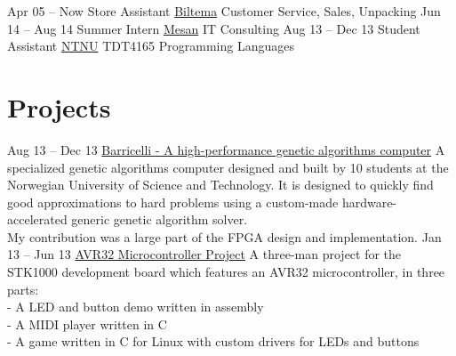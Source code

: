 \documentclass[print]{friggeri-cv}
\begin{document}
\begin{entrylist}
    \entry
        {Apr 05 – Now}
        {Store Assistant}
        {\href{http://biltema.no/}{Biltema}}
        {Customer Service, Sales, Unpacking}
    \entry
        {Jun 14 – Aug 14}
        {Summer Intern}
        {\href{http://mesan.no/}{Mesan}}
        {IT Consulting}
    \entry
        {Aug 13 – Dec 13}
        {Student Assistant}
        {\href{http://ntnu.no/}{NTNU}}
        {TDT4165 Programming Languages}
\end{entrylist}

\section{Projects}

\begin{entrylist}
    \entry
        {Aug 13 – Dec 13}
        {\href{http://barricel.li/}{Barricelli - A high-performance genetic algorithms computer}}
        {}
        {A specialized genetic algorithms computer designed and built by 10 students at the Norwegian University of Science and Technology. It is designed to quickly find good approximations to hard problems using a custom-made hardware-accelerated generic genetic algorithm solver.\\
        My contribution was a large part of the FPGA design and implementation.}
    \entry
        {Jan 13 – Jun 13}
        {\href{https://github.com/lundal/avr32-project-2013}{AVR32 Microcontroller Project}}
        {}
        {A three-man project for the STK1000 development board which features an AVR32 microcontroller, in three parts:\\
        - A LED and button demo written in assembly\\
        - A MIDI player written in C\\
        - A game written in C for Linux with custom drivers for LEDs and buttons}
\end{entrylist}
\end{document}
